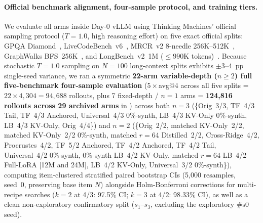 \documentclass[11pt]{article}
\begin{document}
\paragraph{Official benchmark alignment, four-sample protocol, and training tiers.}
We evaluate all arms inside Day-0 vLLM using Thinking Machines' official sampling protocol ($T{=}1.0$, high reasoning
effort) on five exact official splits: GPQA Diamond~\citep[198 items, cap 65,536;][]{gpqa},
LiveCodeBench~v6~\citep[175 items, cap 65,536;][]{livecodebench}, MRCR~v2 8-needle 256K--512K~\citep[100 items, cap
65,536;][]{openai_mrcr}, GraphWalks BFS~256K~\citep[100 items, cap 98,304;][]{openai_mrcr}, and LongBench~v2~1M
($\le 990$K tokens)~\citep[503 items, cap 57,344;][]{longbenchv2}. Because stochastic $T{=}1.0$ sampling on $N{=}100$
long-context splits exhibits $\pm 3\text{--}4$~pp single-seed variance, we ran a symmetric
\textbf{22-arm variable-depth ($n{\ge}2$) full five-benchmark four-sample evaluation} ($5\times$avg@4 across all five splits =
$22\times 4{,}304 = 94{,}688$ rollouts, plus 7 fixed-depth / $n{=}1$ arms = \textbf{124,816 rollouts across 29 archived arms} in
) across both $n{=}3$ (\{Orig~3/3, TF~4/3 Tail, TF~4/3 Anchored,
Universal~4/3 0\%-synth, LB~4/3 KV-Only 0\%-synth, LB~4/3 KV-Only, Orig~4/4\}) and $n{=}2$ (\{Orig~2/2, matched
KV-Only~2/2, matched KV-Only~2/2 0\%-synth, matched $r{=}64$ Distilled~2/2, Cross-Ridge~4/2, Procrustes~4/2,
TF~5/2 Anchored, TF~4/2 Anchored, TF~4/2 Tail, Universal~4/2 0\%-synth, 0\%-synth LB~4/2 KV-Only, matched $r{=}64$
LB~4/2 Full-LoRA [12M and 24M], LB~4/2 KV-Only, Universal~3/2 0\%-synth\}), computing
item-clustered stratified paired bootstrap CIs (5,000 resamples, seed~0, preserving base item $N$) alongside
Holm-Bonferroni corrections for multi-recipe searches ($k{=}2$ at 4/3: 97.5\% CI; $k{=}3$ at 4/2: 98.33\% CI), as well
as a clean non-exploratory confirmatory split ($s_1$--$s_3$, excluding the exploratory $\#\text{s0}$ seed).
\end{document}
